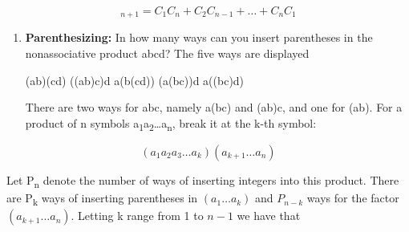 \documentclass[10pt,letter]{article}
\begin{document}
\[
_{n + 1} = C_{1}C_{n} + C_{2}C_{n - 1} + \ldots + C_{n}C_{1}
\]
\begin{enumerate}
\def\labelenumi{\Roman{enumi}.}

\item
  \textbf{Parenthesizing:} In how many ways can you insert parentheses
  in the nonassociative product abcd? The five ways are displayed

(ab)(cd) ((ab)c)d a(b(cd)) (a(bc))d a((bc)d)

There are two ways for abc, namely a(bc) and (ab)c, and one for (ab).
  For a product of n symbols
  a\textsubscript{1}a\textsubscript{2}\ldots{}a\textsubscript{n}, break
  it at the k-th symbol:

\end{enumerate}

\[
\left( a_{1}a_{2}a_{3}\ldots a_{k} \right)(a_{k + 1}\ldots a_{n})
\]

Let P\textsubscript{n} denote the number of ways of inserting integers
into this product. There are P\textsubscript{k} ways of inserting
parentheses in \(\left( a_{1}\ldots a_{k} \right)\) and \(P_{n - k}\)
ways for the factor \((a_{k + 1}\ldots a_{n})\). Letting k range from 1
to \(n - 1\) we have that
\end{document}

